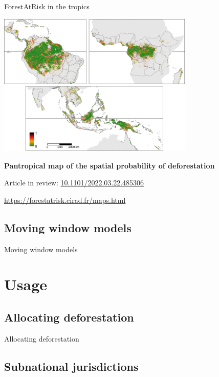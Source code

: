 \documentclass[10pt,table,dvipsnames,compress]{beamer}
\begin{document}
\begin{frame}[label={sec:org2dafe56}]{ForestAtRisk in the tropics}
\begin{center}
\includegraphics[width=0.7\textwidth]{figs/article/prob.png}
\end{center}

\textbf{Pantropical map of the spatial probability of deforestation}

Article in review: \href{https://doi.org/10.1101/2022.03.22.485306}{10.1101/2022.03.22.485306}

\url{https://forestatrisk.cirad.fr/maps.html}
\end{frame}

\subsection{Moving window models}
\label{sec:org40ee9dc}

\begin{frame}[label={sec:org25eb7c1}]{Moving window models}
\end{frame}

\section{Usage}
\label{sec:org94ce2c4}

\subsection{Allocating deforestation}
\label{sec:org159daca}

\begin{frame}[label={sec:orgb0ea3a5}]{Allocating deforestation}
\end{frame}

\subsection{Subnational jurisdictions}
\label{sec:org7f33d2f}
\end{document}
